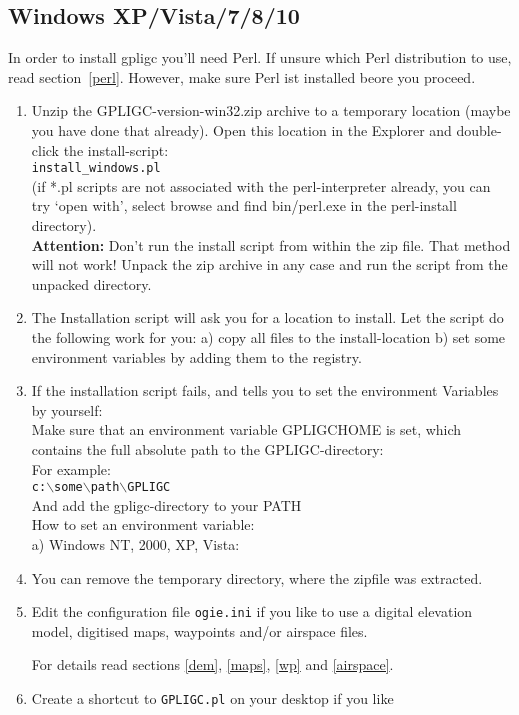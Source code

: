 \subsection{Windows XP/Vista/7/8/10}
\label{windows_install}
In order to install gpligc you'll need Perl. If unsure which Perl distribution to use, read section~\ref{perl}. 
However, make sure Perl ist installed beore you proceed.

\begin{enumerate}
\item Unzip the GPLIGC-version-win32.zip archive to a temporary location
(maybe you have done that already).
Open this location in the Explorer and double-click the install-script: \\
\texttt{install\_windows.pl} \\
(if *.pl scripts are not associated with the perl-interpreter already,
you can try `open with', select browse and find bin/perl.exe in the
perl-install directory).\\
\textbf{Attention:} Don't run the install script from within the zip file. That method will not work!
Unpack the zip archive in any case and run the script from the unpacked directory.

\item The Installation script will ask you for a location to install.
Let the script do the following work for you:
a) copy all files to the install-location
b) set some environment variables by adding them to the registry.

\item If the installation script fails, and tells you to set the environment Variables
by yourself:\\
Make sure that an environment variable GPLIGCHOME is set,
which contains the full absolute path to the GPLIGC-directory:\\
For example: \\
\texttt{c:$\backslash$some$\backslash$path$\backslash$GPLIGC} \\
And add the gpligc-directory to your PATH \\
How to set an environment variable: \\
a) Windows NT, 2000, XP, Vista: \\

\item You can remove the temporary directory, where the zipfile was extracted.

\item Edit the configuration file \texttt{ogie.ini} if you like to use a digital
elevation model, digitised maps, waypoints and/or airspace files.

For details read sections \ref{dem}, \ref{maps}, \ref{wp} and \ref{airspace}.

\item Create a shortcut to \texttt{GPLIGC.pl} on your desktop if you like

\end{enumerate}


